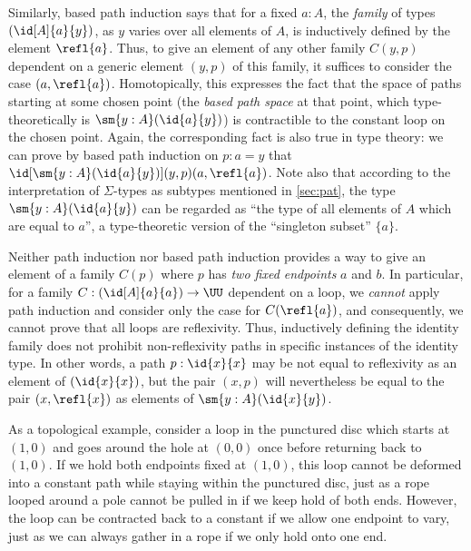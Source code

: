 \begin{rmk}
Similarly, based path induction says that for a fixed $a:A$, the \emph{family} of types $(\id[A]{a}{y})$, as $y$ varies over all elements of $A$, is inductively defined by the element $\refl{a}$.
Thus, to give an element of any other family $C(y,p)$ dependent on a generic element $(y,p)$ of this family, it suffices to consider the case $(a,\refl{a})$.
Homotopically, this expresses the fact that the space of paths starting at some chosen point (the \emph{based path space} at that point, which type-theoretically is $\sm{y:A} (\id{a}{y})$) is contractible to the constant loop on the chosen point.
Again, the corresponding fact is also true in type theory: we can prove by based path induction on $p:a=y$ that $\id[\sm{y:A}(\id{a}{y})]{(y,p)}{(a,\refl{a})}$.
Note also that according to the interpretation of $\Sigma$-types as subtypes mentioned in \cref{sec:pat}, the type $\sm{y:A}(\id{a}{y})$ can be regarded as ``the type of all elements of $A$ which are equal to $a$'', a type-theoretic version of the ``singleton subset'' $\{a\}$.

Neither path induction nor based path induction provides a way to give an element of a family $C(p)$ where $p$ has \emph{two fixed endpoints} $a$ and $b$.
In particular, for a family $C: (\id[A]{a}{a}) \to \UU$ dependent on a loop, we \emph{cannot} apply path induction and consider only the case for $C(\refl{a})$, and consequently, we cannot prove that all loops are reflexivity.
Thus, inductively defining the identity family does not prohibit non-reflexivity paths in specific instances of the identity type.
In other words, a path $p:\id{x}{x}$ may  be not equal to reflexivity as an element of $(\id{x}{x})$, but the pair $(x,p)$ will nevertheless be equal to the pair $(x,\refl{x})$ as elements of $\sm{y:A}(\id{x}{y})$.

As a topological example, consider a loop in the punctured disc  which starts at $(1,0)$ and goes around the hole at $(0,0)$ once before returning back to $(1,0)$.
If we hold both endpoints fixed at $(1,0)$, this loop cannot be deformed into a constant path while staying within the punctured disc, just as a rope looped around a pole cannot be pulled in if we keep hold of both ends.
However, the loop can be contracted back to a constant if we allow one endpoint to vary, just as we can always gather in a rope if we only hold onto one end.
\end{rmk}

%
%

